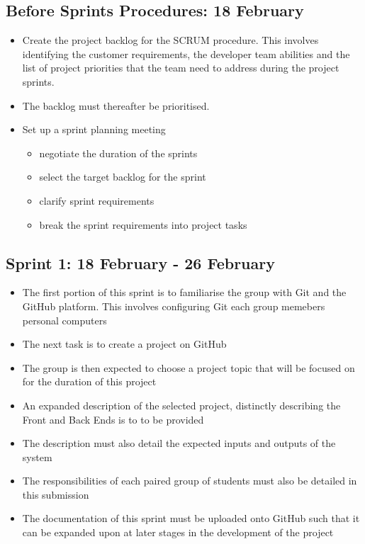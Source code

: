 \documentclass[10pt, a4paper, onecolumn]{scrartcl}
\begin{document}
		\subsection{Before Sprints Procedures: 18 February}
			
			\begin{itemize}
				\item Create the project backlog for the SCRUM procedure. This involves identifying the customer requirements, the developer team abilities and the list of project priorities that the team need to address during the project sprints. 
				\item The backlog must thereafter be prioritised. 
				\item Set up a sprint planning meeting
				\begin{itemize}
					\item negotiate the duration of the sprints 
					\item select the target backlog for the sprint
					\item clarify sprint requirements
					\item break the sprint requirements into project tasks
				\end{itemize}
			\end{itemize}
		
		\subsection{Sprint 1: 18 February - 26 February}
		
			\begin{itemize}[noitemsep]
				\item The first portion of this sprint is to familiarise the group with Git and the GitHub platform. This involves configuring Git each group memebers personal computers 
				\item The next task is to create a project on GitHub
				\item The group is then expected to choose a project topic that will be focused on for the duration of this project
				\item An expanded description of the selected project, distinctly describing the Front and Back Ends is to to be provided
				\item The description must also detail the expected inputs and outputs of the system
				\item The responsibilities of each paired group of students must also be detailed in this submission
				\item The documentation of this sprint must be uploaded onto GitHub such that it can be expanded upon at later stages in the development of the project
			\end{itemize}
			
\end{document}
